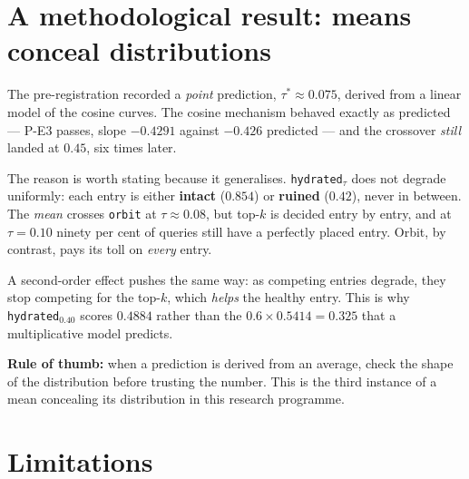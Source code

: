 \documentclass[11pt,a4paper]{article}
\begin{document}
\section{A methodological result: means conceal distributions}

The pre-registration recorded a \emph{point} prediction, $\tau^{*} \approx 0.075$, derived from a
linear model of the cosine curves. The cosine mechanism behaved exactly as predicted --- P-E3 passes,
slope $-0.4291$ against $-0.426$ predicted --- and the crossover \emph{still} landed at $0.45$, six
times later.

The reason is worth stating because it generalises. \texttt{hydrated}$_\tau$ does not degrade
uniformly: each entry is either \textbf{intact} ($0.854$) or \textbf{ruined} ($0.42$), never in
between. The \emph{mean} crosses \texttt{orbit} at $\tau \approx 0.08$, but top-$k$ is decided
entry by entry, and at $\tau = 0.10$ ninety per cent of queries still have a perfectly placed entry.
Orbit, by contrast, pays its toll on \emph{every} entry.

A second-order effect pushes the same way: as competing entries degrade, they stop competing for the
top-$k$, which \emph{helps} the healthy entry. This is why \texttt{hydrated}$_{0.40}$ scores $0.4884$
rather than the $0.6 \times 0.5414 = 0.325$ that a multiplicative model predicts.

\textbf{Rule of thumb:} when a prediction is derived from an average, check the shape of the
distribution before trusting the number. This is the third instance of a mean concealing its
distribution in this research programme.

\section{Limitations}
\end{document}
